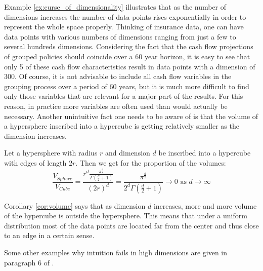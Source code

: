 Example \ref{ex:curse_of_dimensionality} illustrates that as the number of dimensions increases the number of data points rises exponentially in order to represent the whole space properly. Thinking of insurance data, one can have data points with various numbers of dimensions ranging from just a few to several hundreds dimensions. Considering the fact that the cash flow projections of grouped policies should coincide over a 60 year horizon, it is easy to see that only 5 of these cash flow characteristics result in data points with a dimension of 300. Of course, it is not advisable to include all cash flow variables in the grouping process over a period of 60 years, but it is much more difficult to find only those variables that are relevant for a major part of the results. For this reason, in practice more variables are often used than would actually be necessary. Another unintuitive fact one needs to be aware of is that the volume of a hypersphere inscribed into a hypercube is getting relatively smaller as the dimension increases. 

\begin{corollary}\label{cor:volume}
Let a hypersphere with radius $r$ and dimension $d$ be inscribed into a hypercube with edges of length $2r$. Then we get for the proportion of the volumes:
	\begin{equation*}
		\frac{V_{Sphere}}{V_{Cube}} =\frac{r^d\frac{\pi^{\frac{d}{2}}}{\Gamma(\frac{d}{2}+1)}}{(2r)^d} =\frac{\pi^{\frac{d}{2}}}{2^d\Gamma(\frac{d}{2}+1)} \rightarrow 0 \text{ as } d \rightarrow \infty
	\end{equation*}
\end{corollary}

\begin{remark}
Corollary \ref{cor:volume}  says that as dimension $d$ increases, more and more volume of the hypercube is outside the hypersphere. This means that under a uniform distribution most of the data points are located far from the center and thus close to an edge in a certain sense. 
\end{remark}

\begin{remark}
Some other examples why intuition fails in high dimensions are given in paragraph 6 of \cite{domingos2012few}.
\end{remark}

